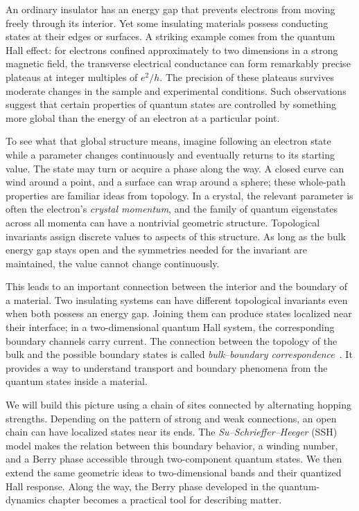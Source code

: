 An ordinary insulator has an energy gap that prevents electrons from moving freely through its interior. Yet some insulating materials possess conducting states at their edges or surfaces. A striking example comes from the quantum Hall effect: for electrons confined approximately to two dimensions in a strong magnetic field, the transverse electrical conductance can form remarkably precise plateaus at integer multiples of $e^2/h$. The precision of these plateaus survives moderate changes in the sample and experimental conditions. Such observations suggest that certain properties of quantum states are controlled by something more global than the energy of an electron at a particular point.

To see what that global structure means, imagine following an electron state while a parameter changes continuously and eventually returns to its starting value. The state may turn or acquire a phase along the way. A closed curve can wind around a point, and a surface can wrap around a sphere; these whole-path properties are familiar ideas from topology. In a crystal, the relevant parameter is often the electron's \emph{crystal momentum}, and the family of quantum eigenstates across all momenta can have a nontrivial geometric structure. Topological invariants assign discrete values to aspects of this structure. As long as the bulk energy gap stays open and the symmetries needed for the invariant are maintained, the value cannot change continuously.

This leads to an important connection between the interior and the boundary of a material. Two insulating systems can have different topological invariants even when both possess an energy gap. Joining them can produce states localized near their interface; in a two-dimensional quantum Hall system, the corresponding boundary channels carry current. The connection between the topology of the bulk and the possible boundary states is called \emph{bulk--boundary correspondence}~\cite{TKNN1982,QiZhang2011}. It provides a way to understand transport and boundary phenomena from the quantum states inside a material.

We will build this picture using a chain of sites connected by alternating hopping strengths. Depending on the pattern of strong and weak connections, an open chain can have localized states near its ends. The \emph{Su--Schrieffer--Heeger} (SSH) model makes the relation between this boundary behavior, a winding number, and a Berry phase accessible through two-component quantum states. We then extend the same geometric ideas to two-dimensional bands and their quantized Hall response. Along the way, the Berry phase developed in the quantum-dynamics chapter becomes a practical tool for describing matter.

